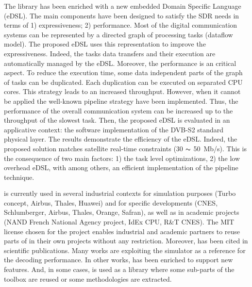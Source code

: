 The \AFFECT library has been enriched with a new embedded Domain Specific
Language (eDSL). The main components have been designed to satisfy the SDR needs
in terms of 1) expressiveness; 2) performance. Most of the digital communication
systems can be represented by a directed graph of processing tasks (dataflow
model). The proposed eDSL uses this representation to improve the
expressiveness. Indeed, the tasks data transfers and their execution are
automatically managed by the eDSL. Moreover, the performance is an critical
aspect. To reduce the execution time, some data independent parts of the graph
of tasks can be duplicated. Each duplication can be executed on separated CPU
cores. This strategy leads to an increased throughput. However, when it cannot
be applied the well-known pipeline strategy have been implemented. Thus, the
performance of the overall communication system can be increased up to the
throughput of the slowest task. Then, the proposed eDSL is evaluated in an
applicative context: the software implementation of the DVB-S2 standard physical
layer. The results demonstrate the efficiency of the \AFFECT eDSL. Indeed, the
proposed solution matches satellite real-time constraints (30 $\thicksim$
50~Mb/s). This is the consequence of two main factors: 1) the task level
optimizations, 2) the low overhead eDSL, with among others, an efficient
implementation of the pipeline technique.

\AFFECT is currently used in several industrial contexts for simulation purposes
(Turbo concept, Airbus, Thales, Huawei) and for specific developments (CNES,
Schlumberger, Airbus, Thales, Orange, Safran), as well as in academic projects
(NAND French National Agency project, IdEx CPU, R\&T CNES). The MIT license
chosen for the project enables industrial and academic partners to reuse parts
of \AFFECT in their own projects without any restriction. Moreover, \AFFECT has
been cited in scientific publications. Many works are exploiting the \AFFECT
simulator as a reference for the decoding performance. In other works, \AFFECT
has been enriched to support new features. And, in some cases, \AFFECT is used
as a library where some sub-parts of the toolbox are reused or some
methodologies are extracted.

